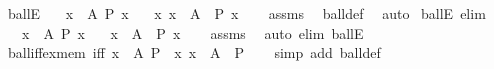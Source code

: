 \begin{isabellebody}
\endisatagproof
{\isafoldproof}%
%
\isadelimproof
\isanewline
%
\endisadelimproof
\isanewline
{}\isamarkupfalse%
\ ballE{\isacharcolon}{\kern0pt}\isanewline
\ \ \ {\isachardoublequoteopen}{\isasymforall}x\ {\isasymin}\ A{\isachardot}{\kern0pt}\ P\ x{\isachardoublequoteclose}\isanewline
\ \ \ {\isachardoublequoteopen}{\isasymAnd}x{\isachardot}{\kern0pt}\ x\ {\isasymin}\ A\ {\isasymLongrightarrow}\ P\ x{\isachardoublequoteclose}\isanewline
%
\isadelimproof
\ \ %
\endisadelimproof
%
\isatagproof
{}\isamarkupfalse%
\ assms\ \isamarkupfalse%
\ ball{\isacharunderscore}{\kern0pt}def\ \isamarkupfalse%
\ auto%
\endisatagproof
{\isafoldproof}%
%
\isadelimproof
\isanewline
%
\endisadelimproof
\isanewline
{}\isamarkupfalse%
\ ballE{\isacharprime}{\kern0pt}\ {\isacharbrackleft}{\kern0pt}elim{\isacharbrackright}{\kern0pt}{\isacharcolon}{\kern0pt}\isanewline
\ \ \ {\isachardoublequoteopen}{\isasymforall}x\ {\isasymin}\ A{\isachardot}{\kern0pt}\ P\ x{\isachardoublequoteclose}\isanewline
\ \ \ {\isachardoublequoteopen}x\ {\isasymnotin}\ A{\isachardoublequoteclose}\ {\isacharbar}{\kern0pt}\ {\isachardoublequoteopen}P\ x{\isachardoublequoteclose}\isanewline
%
\isadelimproof
\ \ %
\endisadelimproof
%
\isatagproof
{}\isamarkupfalse%
\ assms\ \isamarkupfalse%
\ {\isacharparenleft}{\kern0pt}auto\ elim{\isacharcolon}{\kern0pt}\ ballE{\isacharparenright}{\kern0pt}%
\endisatagproof
{\isafoldproof}%
%
\isadelimproof
\isanewline
%
\endisadelimproof
\isanewline
\isanewline
{}\isamarkupfalse%
\ ball{\isacharunderscore}{\kern0pt}iff{\isacharunderscore}{\kern0pt}ex{\isacharunderscore}{\kern0pt}mem\ {\isacharbrackleft}{\kern0pt}iff{\isacharbrackright}{\kern0pt}{\isacharcolon}{\kern0pt}\ {\isachardoublequoteopen}{\isacharparenleft}{\kern0pt}{\isasymforall}x\ {\isasymin}\ A{\isachardot}{\kern0pt}\ P{\isacharparenright}{\kern0pt}\ {\isasymlongleftrightarrow}\ {\isacharparenleft}{\kern0pt}{\isacharparenleft}{\kern0pt}{\isasymexists}x{\isachardot}{\kern0pt}\ x\ {\isasymin}\ A{\isacharparenright}{\kern0pt}\ {\isasymlongrightarrow}\ P{\isacharparenright}{\kern0pt}{\isachardoublequoteclose}\isanewline
%
\isadelimproof
\ \ %
\endisadelimproof
%
\isatagproof
{}\isamarkupfalse%
\ {\isacharparenleft}{\kern0pt}simp\ add{\isacharcolon}{\kern0pt}\ ball{\isacharunderscore}{\kern0pt}def{\isacharparenright}{\kern0pt}%
\endisatagproof
{\isafoldproof}%
%
\isadelimproof
\isanewline
%
\endisadelimproof

\end{isabellebody}
